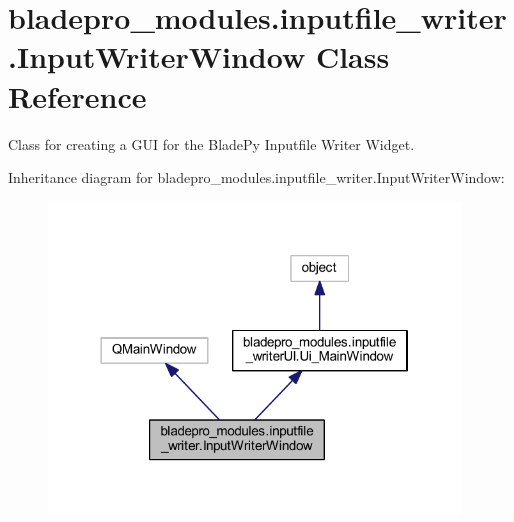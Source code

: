 \hypertarget{a00070}{}\section{bladepro\+\_\+modules.\+inputfile\+\_\+writer.\+Input\+Writer\+Window Class Reference}
\label{a00070}


Class for creating a G\+UI for the Blade\+Py Inputfile Writer Widget.  




Inheritance diagram for bladepro\+\_\+modules.\+inputfile\+\_\+writer.\+Input\+Writer\+Window\+:\nopagebreak
\begin{figure}[H]
\begin{center}
\leavevmode
\includegraphics[width=310pt]{a00069}
\end{center}
\end{figure}
